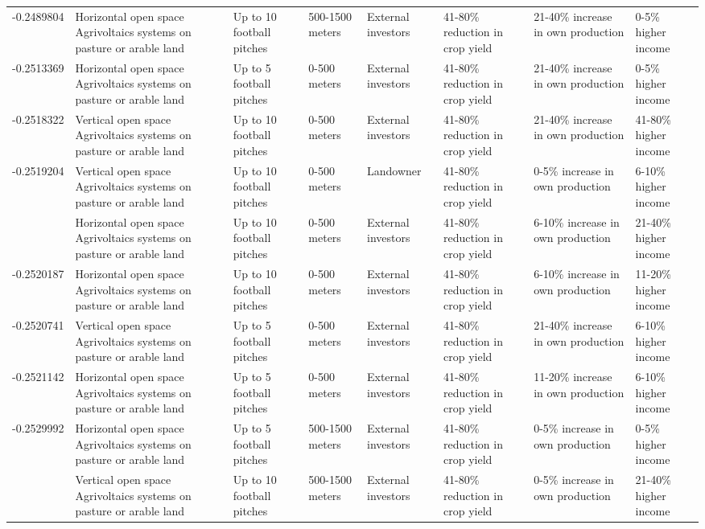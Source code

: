 \begin{table}
\begin{tabular}[t]{rlllllll}
-0.2489804 & Horizontal open space Agrivoltaics
systems on pasture or arable land & Up to 10 football pitches & 500-1500 meters & External investors & 41-80\% reduction in crop yield & 21-40\% increase in own production & 0-5\% higher income\\
-0.2513369 & Horizontal open space Agrivoltaics
systems on pasture or arable land & Up to 5 football pitches & 0-500 meters & External investors & 41-80\% reduction in crop yield & 21-40\% increase in own production & 0-5\% higher income\\
-0.2518322 & Vertical open space Agrivoltaics
systems on pasture or arable land & Up to 10 football pitches & 0-500 meters & External investors & 41-80\% reduction in crop yield & 21-40\% increase in own production & 41-80\% higher income\\
-0.2519204 & Vertical open space Agrivoltaics
systems on pasture or arable land & Up to 10 football pitches & 0-500 meters & Landowner & 41-80\% reduction in crop yield & 0-5\% increase in own production & 6-10\% higher income\\
\addlinespace
-0.2520187 & Horizontal open space Agrivoltaics
systems on pasture or arable land & Up to 10 football pitches & 0-500 meters & External investors & 41-80\% reduction in crop yield & 6-10\% increase in own production & 21-40\% higher income\\
-0.2520187 & Horizontal open space Agrivoltaics
systems on pasture or arable land & Up to 10 football pitches & 0-500 meters & External investors & 41-80\% reduction in crop yield & 6-10\% increase in own production & 11-20\% higher income\\
-0.2520741 & Vertical open space Agrivoltaics
systems on pasture or arable land & Up to 5 football pitches & 0-500 meters & External investors & 41-80\% reduction in crop yield & 21-40\% increase in own production & 6-10\% higher income\\
-0.2521142 & Horizontal open space Agrivoltaics
systems on pasture or arable land & Up to 5 football pitches & 0-500 meters & External investors & 41-80\% reduction in crop yield & 11-20\% increase in own production & 6-10\% higher income\\
-0.2529992 & Horizontal open space Agrivoltaics
systems on pasture or arable land & Up to 5 football pitches & 500-1500 meters & External investors & 41-80\% reduction in crop yield & 0-5\% increase in own production & 0-5\% higher income\\
\addlinespace
-0.2533526 & Vertical open space Agrivoltaics
systems on pasture or arable land & Up to 10 football pitches & 500-1500 meters & External investors & 41-80\% reduction in crop yield & 0-5\% increase in own production & 21-40\% higher income\\

\end{tabular}
\end{table}
